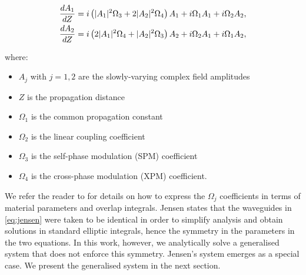 \documentclass[11pt,a4paper]{article}
\numberwithin{equation}{section}
\begin{document}
\begin{align}
\frac{dA_1}{dZ} &= i \left(|A_1|^2 {\Omega}_{3} + 2 |A_2|^2 {\Omega}_{4}\right) A_1 + i {\Omega}_{1} A_1  + i {\Omega}_{2} A_2, \notag \\
\frac{dA_2}{dZ} &= i \left(2 |A_1|^2 {\Omega}_{4} + |A_2|^2 {\Omega}_{3}\right) A_2 + i {\Omega}_{2} A_1  + i {\Omega}_{1} A_2, \label{eq:jensen}
\end{align}

where:
\begin{itemize}
    \item $A_j$ with $j=1,2$ are the slowly-varying complex field amplitudes
    \item $Z$ is the propagation distance
    \item $\Omega_1$ is the common propagation constant
    \item $\Omega_2$ is the linear coupling coefficient
    \item $\Omega_3$ is the self-phase modulation (SPM) coefficient
    \item $\Omega_4$ is the cross-phase modulation (XPM) coefficient.
\end{itemize}
We refer the reader to \cite{jensenNonlinearCoherentCoupler1982} for details on how to express the $\Omega_j$ coefficients in terms of material parameters and overlap integrals. 
Jensen states that the waveguides in \eqref{eq:jensen} were taken to be identical in order to simplify analysis and obtain solutions in standard elliptic integrals, hence the symmetry in the parameters in the two equations.
In this work, however, we analytically solve a generalised system that does not enforce this symmetry.
Jensen's system emerges as a special case.
We present the generalised system in the next section. 


\end{document}

